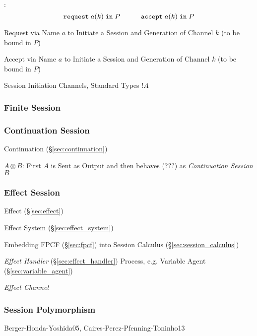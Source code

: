 \cite{honda-vasconcelos-kubo98}:
\[
  \mathtt{request} \; a(k) \; \mathtt{in} \; P
  \quad\quad\quad
  \mathtt{accept} \; a(k) \; \mathtt{in} \; P
\]

Request via Name $a$ to Initiate a Session and Generation of Channel
$k$ (to be bound in $P$)

Accept via Name $a$ to Initiate a Session and Generation of Channel
$k$ (to be bound in $P$)

Session Initiation Channels, Standard Types $!A$



\subsubsection{Finite Session}\label{sec:finite_session}

\subsubsection{Continuation Session}\label{sec:continuation_session}

Continuation (\S\ref{sec:continuation})

$A \otimes B$: First $A$ is Sent as Output and then behaves (???) as
\emph{Continuation Session} $B$



\subsubsection{Effect Session}\label{sec:effect_session}

\cite{orchard-yoshida16}

Effect (\S\ref{sec:effect})

Effect System (\S\ref{sec:effect_system})

Embedding FPCF (\S\ref{sec:fpcf}) into Session Calculus
(\S\ref{sec:session_calculus})

\emph{Effect Handler} (\S\ref{sec:effect_handler}) Process, e.g.
Variable Agent (\S\ref{sec:variable_agent})

\emph{Effect Channel}



\subsubsection{Session Polymorphism}\label{sec:session_polymorphism}


Berger-Honda-Yoshida05, Caires-Perez-Pfenning-Toninho13

